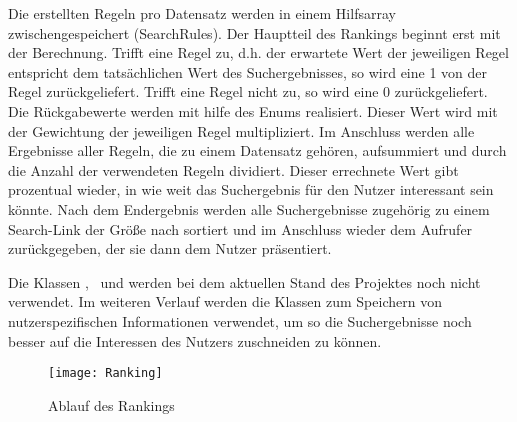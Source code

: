 Die erstellten Regeln pro Datensatz werden in einem Hilfsarray zwischengespeichert (SearchRules). Der Hauptteil des Rankings beginnt erst mit der Berechnung. Trifft eine Regel zu, d.h. der erwartete Wert der jeweiligen Regel entspricht dem tatsächlichen Wert des Suchergebnisses, so wird eine 1 von der Regel zurückgeliefert. Trifft eine Regel nicht zu, so wird eine 0 zurückgeliefert. Die Rückgabewerte werden mit hilfe des Enums \glqq\RuleMatch\grqq\xspace realisiert. Dieser Wert wird mit der Gewichtung der jeweiligen Regel multipliziert. Im Anschluss werden alle Ergebnisse aller Regeln, die zu einem Datensatz gehören, aufsummiert und durch die Anzahl der verwendeten Regeln dividiert. Dieser errechnete Wert gibt prozentual wieder, in wie weit das Suchergebnis für den Nutzer interessant sein könnte. Nach dem Endergebnis werden alle Suchergebnisse zugehörig zu einem Search-Link der Größe nach sortiert und im Anschluss wieder dem Aufrufer zurückgegeben, der sie dann dem Nutzer präsentiert. 

Die Klassen \glqq\PersistenceController\grqq\xspace, \glqq\RankingDataObject\grqq\ und \glqq\RankingDataObjectPersistency\grqq\xspace werden bei dem aktuellen Stand des Projektes noch nicht verwendet. Im weiteren Verlauf werden die Klassen zum Speichern von nutzerspezifischen Informationen verwendet, um so die Suchergebnisse noch besser auf die Interessen des Nutzers zuschneiden zu können.

\begin{figure}[h]
	\centering
	\texttt{[image: Ranking]}
	\caption{Ablauf des Rankings}
	\label{fig:Rankingablauf}
\end{figure}


